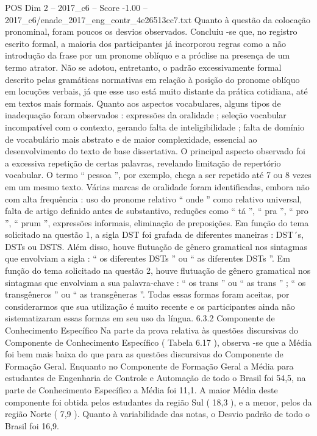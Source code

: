 \begin{textsample}{POS Dim 2 – 2017\_c6 – Score -1.00 – 2017\_c6/enade\_2017\_eng\_contr\_4e26513cc7.txt}
Quanto à questão da colocação pronominal, foram poucos os desvios observados.
Concluiu -se que, no registro escrito formal, a maioria dos participantes já incorporou regras como a não introdução da frase por um pronome oblíquo e a próclise na presença de um termo atrator.
Não se adotou, entretanto, o padrão excessivamente formal descrito pelas gramáticas normativas em relação à posição do pronome oblíquo em locuções verbais, já que esse uso está muito distante da prática cotidiana, até em textos mais formais.
Quanto aos aspectos vocabulares, alguns tipos de inadequação foram observados : expressões da oralidade ; seleção vocabular incompatível com o contexto, gerando falta de inteligibilidade ; falta de domínio de vocabulário mais abstrato e de maior complexidade, essencial ao desenvolvimento do texto de base dissertativa.
O principal aspecto observado foi a excessiva repetição de certas palavras, revelando limitação de repertório vocabular.
O termo “ pessoa ”, por exemplo, chega a ser repetido até 7 ou 8 vezes em um mesmo texto.
Várias marcas de oralidade foram identificadas, embora não com alta frequência : uso do pronome relativo “ onde ” como relativo universal, falta de artigo definido antes de substantivo, reduções como “ tá ”, “ pra ”, “ pro ”, “ prum ”, expressões informais, eliminação de preposições.
Em função do tema solicitado na questão 1, a sigla DST foi grafada de diferentes maneiras : DST´s, DSTs ou DSTS.
Além disso, houve flutuação de gênero gramatical nos sintagmas que envolviam a sigla : “ os diferentes DSTs ” ou “ as diferentes DSTs ”.
Em função do tema solicitado na questão 2, houve flutuação de gênero gramatical nos sintagmas que envolviam a sua palavra-chave : “ os trans ” ou “ as trans ” ; “ os transgêneros ” ou “ as transgêneras ”.
Todas essas formas foram aceitas, por considerarmos que sua utilização é muito recente e os participantes ainda não sistematizaram essas formas em seu uso da língua. 6.3.2 Componente de Conhecimento Específico Na parte da prova relativa às questões discursivas do Componente de Conhecimento Específico ( Tabela 6.17 ), observa -se que a Média foi bem mais baixa do que para as questões discursivas do Componente de Formação Geral.
Enquanto no Componente de Formação Geral a Média para estudantes de Engenharia de Controle e Automação de todo o Brasil foi 54,5, na parte de Conhecimento Específico a Média foi 11,1.
A maior Média deste componente foi obtida pelos estudantes da região Sul ( 18,3 ), e a menor, pelos da região Norte ( 7,9 ).
Quanto à variabilidade das notas, o Desvio padrão de todo o Brasil foi 16,9.

\end{textsample}
